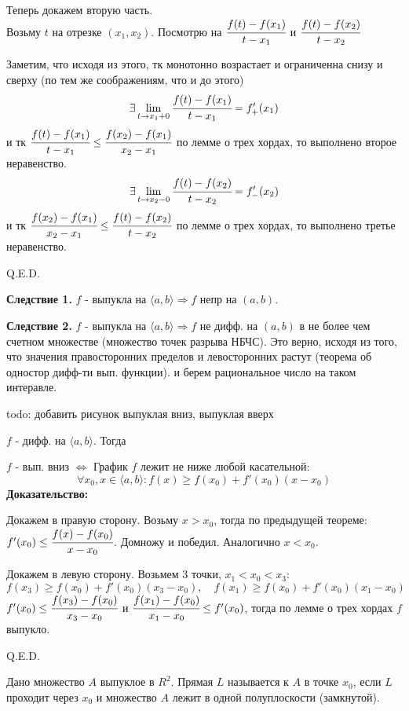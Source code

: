 Теперь докажем вторую часть.\\
Возьму $t$ на отрезке $(x_1,x_2)$. Посмотрю на  $\cfrac{f(t)-f(x_1)}{t-x_1}$ и $\cfrac{f(t)-f(x_2)}{t-x_2}$

Заметим, что исходя из этого, тк монотонно возрастает и ограниченна снизу и сверху (по тем же соображениям, что и до этого)
$$\exists  \lim\limits_{t \rightarrow x_1 + 0}\cfrac{f(t)-f(x_1)}{t-x_1} = f'_+(x_1)$$ и тк $\cfrac{f(t)-f(x_1)}{t-x_1}\leq\cfrac{f(x_2)-f(x_1)}{x_2-x_1}$ по лемме о трех хордах, то выполнено второе неравенство.
$$\exists  \lim\limits_{t \rightarrow x_2 - 0}\cfrac{f(t)-f(x_2)}{t-x_2} = f'_-(x_2)$$ и тк $ \cfrac{f(x_2)-f(x_1)}{x_2-x_1}\leq \cfrac{f(t)-f(x_2)}{t-x_2}$ по лемме о трех хордах, то выполнено третье неравенство.

\hfill Q.E.D.

\textbf{Следствие 1.} $f$ - выпукла на $\langle a,b\rangle \Rightarrow f$ непр на $(a,b)$.

\textbf{Следствие 2.} $f$ - выпукла на $\langle a,b\rangle \Rightarrow f$ не дифф. на $(a,b)$ в не более чем счетном множестве (множество точек разрыва НБЧС). Это верно, исходя из того, что значения правосторонних пределов и левосторонних растут (теорема об одностор дифф-ти вып. функции). и берем рациональное число на таком интеравле.

todo: добавить рисунок выпуклая вниз, выпуклая вверх


$f$ - дифф. на $\langle a,b \rangle$. Тогда

$f$ - вып. вниз $\Leftrightarrow$ График $f$ лежит не ниже любой касательной:
$$\forall x_0,x \in \langle a,b\rangle: f(x) \geq f(x_0) + f'(x_0)(x-x_0)$$
\textbf{Доказательство:}

Докажем в правую сторону. Возьму $x>x_0$, тогда по предыдущей теореме: $f'(x_0)\leq \cfrac{f(x)-f(x_0)}{x-x_0}$. Домножу и победил. Аналогично $x<x_0$.

Докажем в левую сторону. Возьмем 3 точки, $x_1<x_0<x_3$:
$$f(x_3)\geq f(x_0)+f'(x_0)(x_3-x_0),\quad f(x_1)\geq f(x_0)+f'(x_0)(x_1-x_0)$$
$f'(x_0)\leq \cfrac{f(x_3)-f(x_0)}{x_3-x_0}$ и $ \cfrac{f(x_1)-f(x_0)}{x_1-x_0} \leq f'(x_0)$, тогда  по лемме о трех хордах $f$ выпукло.

\hfill Q.E.D.


 Дано множество $A$ выпуклое в $R^2$. Прямая $L$ называется  к $A$ в точке $x_0$, если $L$ проходит через $x_0$ и множество $A$ лежит в одной полуплоскости (замкнутой).

